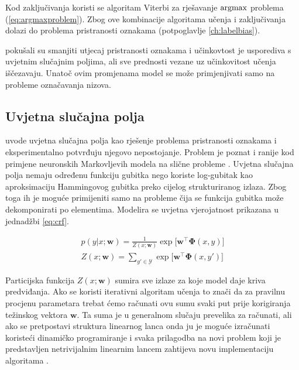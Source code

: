 Kod zaključivanja koristi se algoritam Viterbi za rješavanje $\operatorname*{argmax}$ problema
(\ref{eq:argmaxproblem}). Zbog ove kombinacije algoritama učenja i zaključivanja
dolazi do problema pristranosti oznakama (potpoglavlje \ref{ch:labelbias}).

\cite{cohen05ijcai} pokušali su smanjiti utjecaj pristranosti oznakama i
učinkovtost je usporediva s uvjetnim slučajnim poljima, ali sve prednosti vezane
uz učinkovitost učenja iščezavaju. Unatoč ovim promjenama model se može
primjenjivati samo na probleme označavanja nizova.


\subsection{Uvjetna slučajna polja}

\citet*{lafferty2001conditional} uvode uvjetna slučajna polja kao rješenje
problema pristranosti oznakama i eksperimentalno potvrđuju njegovo nepostojanje.
Problem je poznat i ranije kod primjene neuronskih Markovljevih modela na slične
probleme \citep{leon1991approche}. Uvjetna slučajna polja nemaju određenu
funkciju gubitka nego koriste log-gubitak kao aproksimaciju Hammingovog gubitka
preko cijelog strukturiranog izlaza. Zbog toga ih je moguće primijeniti samo na
probleme čija se funkcija gubitka može dekomponirati po elementima. Modelira se
uvjetna vjerojatnost prikazana u jednadžbi \ref{eq:crf}.

\begin{equation}\label{eq:crf}
\begin{aligned}
  p(y | x; \mathbf{w}) = \frac{1}{Z(x; \mathbf{w})} \exp \big[ \mathbf{w}^\top \mathbf{\Phi}(x, y)\big] \\
  Z(x; \mathbf{w}) = \sum_{y' \in \mathcal{Y}} \exp \big[ \mathbf{w}^\top \mathbf{\Phi}(x, y')\big]
\end{aligned}
\end{equation}

\noindent
Particijska funkcija $Z(x; \mathbf{w})$ sumira sve izlaze za koje model
daje kriva predviđanja. Ako se koristi iterativni algoritam učenja to znači da
za pravilnu procjenu parametara trebat ćemo računati ovu sumu svaki put prije
korigiranja težinskog vektora $\mathbf{w}$. Ta suma je u generalnom slučaju
prevelika za računati, ali ako se pretpostavi struktura linearnog lanca onda ju
je moguće izračunati koristeći dinamičko programiranje i svaka prilagodba na
novi problem koji je predstavljen netrivijalnim linearnim lancem zahtijeva novu
implementaciju algoritama \citep{lafferty2001conditional, sha2003shallow}.

